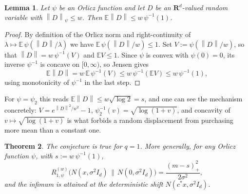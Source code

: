 \documentclass[11pt,reqno]{amsart}
\newtheorem{theorem}{Theorem}
\newtheorem{lemma}[theorem]{Lemma}
\theoremstyle{definition}
\theoremstyle{remark}
\def\R{\mathbf{R}}
\newcommand{\ee}{\mathbb{E}}
\newcommand{\norm}[1]{\left\lVert#1\right\rVert}
\numberwithin{equation}{section}
\begin{document}
\begin{lemma}\label{lem:jensen}
Let $\psi$ be an Orlicz function and let $D$ be an $\R^d$-valued random variable with $\norm{D}_{\psi}\le w$. Then $\ee\norm{D}\le w\,\psi^{-1}(1)$.
\end{lemma}

\begin{proof}
By definition of the Orlicz norm and right-continuity of $\lambda\mapsto \ee\,\psi(\norm{D}/\lambda)$ we have $\ee\,\psi(\norm{D}/w)\le 1$. Set $V:=\psi(\norm{D}/w)$, so that $\norm{D}=w\,\psi^{-1}(V)$ and $\ee V\le 1$. Since $\psi$ is convex with $\psi(0)=0$, its inverse $\psi^{-1}$ is concave on $[0,\infty)$, so Jensen gives
$$\ee\norm{D}=w\,\ee\,\psi^{-1}(V)\le w\,\psi^{-1}(\ee V)\le w\,\psi^{-1}(1),$$
using monotonicity of $\psi^{-1}$ in the last step.
\end{proof}

For $\psi=\psi_2$ this reads $\ee\norm{D}\le w\sqrt{\log 2}=s$, and one can see the mechanism concretely: $V=e^{\norm{D}^2/w^2}-1$, $\psi_2^{-1}(v)=\sqrt{\log(1+v)}$, and concavity of $v\mapsto\sqrt{\log(1+v)}$ is what forbids a random displacement from purchasing more mean than a constant one.

\begin{theorem}\label{thm:q1}
The conjecture is true for $q=1$. More generally, for any Orlicz function $\psi$, with $s:=w\,\psi^{-1}(1)$,
$$R^{(w)}_{1,\psi}\big(N(x,\sigma^2I_d)\,\big\|\,N(0,\sigma^2I_d)\big)=\frac{(m-s)_+^2}{2\sigma^2},$$
and the infimum is attained at the deterministic shift $N(c^*x,\sigma^2I_d)$.
\end{theorem}
\end{document}

